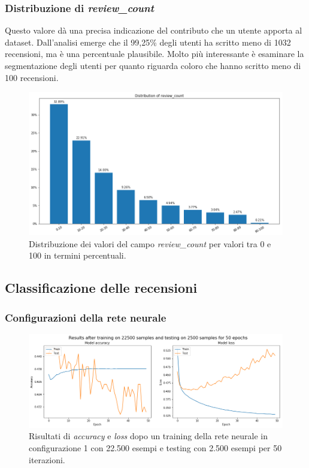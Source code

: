 \documentclass[12pt]{article}
\begin{document}
\subsubsection{Distribuzione di \textit{review\_count}}
Questo valore dà una precisa indicazione del contributo che un utente apporta al dataset. Dall'analisi emerge che il 99,25\% degli utenti ha scritto meno di 1032 recensioni, ma è una percentuale plausibile. Molto più interessante è esaminare la segmentazione degli utenti per quanto riguarda coloro che hanno scritto meno di 100 recensioni.
\begin{figure}[H]
\centering
\includegraphics[width=\textwidth]{images/review_count_distribution.png}
\caption{Distribuzione dei valori del campo \textit{review\_count} per valori tra 0 e 100 in termini percentuali.}
\end{figure}

\subsection{Classificazione delle recensioni}

\subsubsection{Configurazioni della rete neurale}



\begin{figure}[H]
\centering
\includegraphics[width=\textwidth]{images/config1_25000samples_50epochs.png}
\caption{Risultati di \textit{accuracy} e \textit{loss} dopo un training della rete neurale in configurazione 1 con 22.500 esempi e testing con 2.500 esempi per 50 iterazioni.}
\end{figure}
\end{document}
